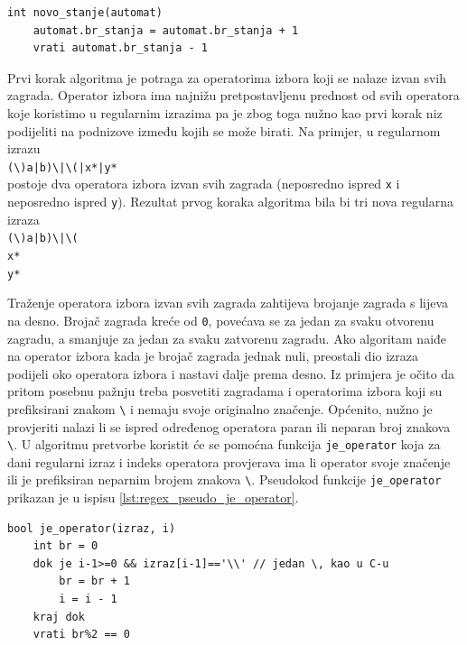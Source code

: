 \documentclass[times, 12pt, utf8]{book}
\begin{document}
\begin{lstlisting}[caption={Pseudokod funkcije za dodavanje stanja automatu.},label=lst:regex_pseudo_novo_stanje]
int novo_stanje(automat)
	automat.br_stanja = automat.br_stanja + 1
	vrati automat.br_stanja - 1
\end{lstlisting}

Prvi korak algoritma je potraga za operatorima izbora koji se nalaze izvan svih zagrada.
Operator izbora ima najnižu pretpostavljenu prednost od svih operatora koje koristimo u regularnim izrazima pa je zbog toga nužno kao prvi korak niz podijeliti na podnizove između kojih se može birati.
Na primjer, u regularnom izrazu\\
\verb=(\)a|b)\|\(|x*|y*=\\
postoje dva operatora izbora izvan svih zagrada (neposredno ispred \verb|x| i neposredno ispred \verb|y|).
Rezultat prvog koraka algoritma bila bi tri nova regularna izraza\\
\verb=(\)a|b)\|\(=\\
\verb|x*|\\
\verb|y*|

Traženje operatora izbora izvan svih zagrada zahtijeva brojanje zagrada s lijeva na desno.
Brojač zagrada kreće od \verb|0|, povećava se za jedan za svaku otvorenu zagradu, a smanjuje za jedan za svaku zatvorenu zagradu.
Ako algoritam naiđe na operator izbora kada je brojač zagrada jednak nuli, preostali dio izraza podijeli oko operatora izbora i nastavi dalje prema desno.
Iz primjera je očito da pritom posebnu pažnju treba posvetiti zagradama i operatorima izbora koji su prefiksirani znakom \verb|\| i nemaju svoje originalno značenje.
Općenito, nužno je provjeriti nalazi li se ispred određenog operatora paran ili neparan broj znakova \verb|\|.
U algoritmu pretvorbe koristit će se pomoćna funkcija \verb|je_operator| koja za dani regularni izraz i indeks operatora provjerava ima li operator svoje značenje ili je prefiksiran neparnim brojem znakova \verb|\|.
Pseudokod funkcije \verb|je_operator| prikazan je u ispisu \ref{lst:regex_pseudo_je_operator}.

\begin{lstlisting}[caption={Pseudokod funkcije \texttt{je\_operator}.},label=lst:regex_pseudo_je_operator]
bool je_operator(izraz, i)
	int br = 0
	dok je i-1>=0 && izraz[i-1]=='\\' // jedan \, kao u C-u
	    br = br + 1
	    i = i - 1
	kraj dok
	vrati br%2 == 0
\end{lstlisting}
\end{document}
